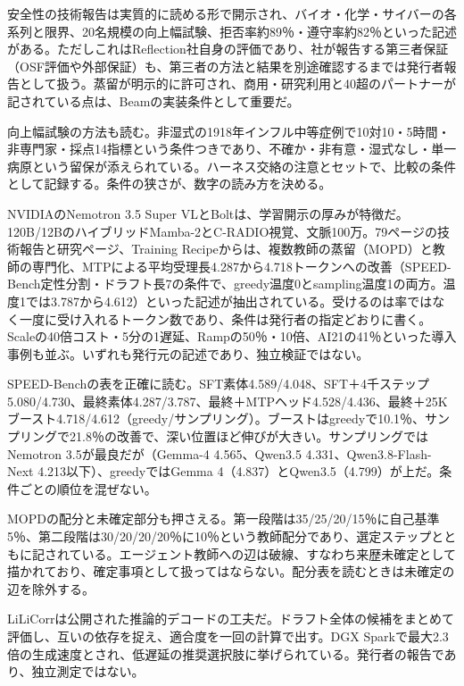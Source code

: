 \documentclass[lualatex,a4paper,10pt]{jlreq}
\begin{document}
安全性の技術報告は実質的に読める形で開示され、バイオ・化学・サイバーの各系列と限界、20名規模の向上幅試験、拒否率約89％・遵守率約82％といった記述がある。ただしこれはReflection社自身の評価であり、社が報告する第三者保証（OSF評価や外部保証）も、第三者の方法と結果を別途確認するまでは発行者報告として扱う。蒸留が明示的に許可され、商用・研究利用と40超のパートナーが記されている点は、Beamの実装条件として重要だ。
\cite{B17,B19,B18,B16}


向上幅試験の方法も読む。非湿式の1918年インフル中等症例で10対10・5時間・非専門家・採点14指標という条件つきであり、不確か・非有意・湿式なし・単一病原という留保が添えられている。ハーネス交絡の注意とセットで、比較の条件として記録する。条件の狭さが、数字の読み方を決める。
\cite{B17,B19,B18,B16}


NVIDIAのNemotron 3.5 Super VLとBoltは、学習開示の厚みが特徴だ。120B/12BのハイブリッドMamba-2とC-RADIO視覚、文脈100万。79ページの技術報告と研究ページ、Training Recipeからは、複数教師の蒸留（MOPD）と教師の専門化、MTPによる平均受理長4.287から4.718トークンへの改善（SPEED-Bench定性分割・ドラフト長7の条件で、greedy温度0とsampling温度1の両方。温度1では3.787から4.612）といった記述が抽出されている。受けるのは率ではなく一度に受け入れるトークン数であり、条件は発行者の指定どおりに書く。Scaleの40倍コスト・5分の1遅延、Rampの50％・10倍、AI21の41％といった導入事例も並ぶ。いずれも発行元の記述であり、独立検証ではない。
\cite{B21,B72,B22,B20,B60}


SPEED-Benchの表を正確に読む。SFT素体4.589/4.048、SFT＋4千ステップ5.080/4.730、最終素体4.287/3.787、最終＋MTPヘッド4.528/4.436、最終＋25Kブースト4.718/4.612（greedy/サンプリング）。ブーストはgreedyで10.1％、サンプリングで21.8％の改善で、深い位置ほど伸びが大きい。サンプリングではNemotron 3.5が最良だが（Gemma-4 4.565、Qwen3.5 4.331、Qwen3.8-Flash-Next 4.213以下）、greedyではGemma 4（4.837）とQwen3.5（4.799）が上だ。条件ごとの順位を混ぜない。
\cite{B21,B72,B22,B20,B60}


MOPDの配分と未確定部分も押さえる。第一段階は35/25/20/15％に自己基準5％、第二段階は30/20/20/20％に10％という教師配分であり、選定ステップとともに記されている。エージェント教師への辺は破線、すなわち来歴未確定として描かれており、確定事項として扱ってはならない。配分表を読むときは未確定の辺を除外する。
\cite{B21,B72,B22,B20}


LiLiCorrは公開された推論的デコードの工夫だ。ドラフト全体の候補をまとめて評価し、互いの依存を捉え、適合度を一回の計算で出す。DGX Sparkで最大2.3倍の生成速度とされ、低遅延の推奨選択肢に挙げられている。発行者の報告であり、独立測定ではない。
\cite{B21,B72,B22,B20}
\end{document}

